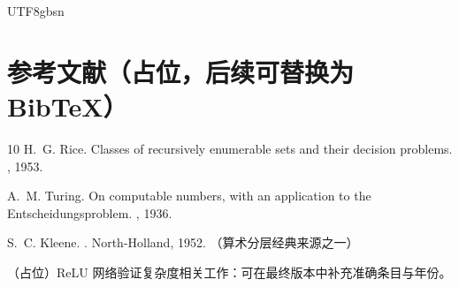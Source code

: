 \documentclass[letterpaper,twocolumn,10pt]{article}
\begin{document}
\begin{CJK}{UTF8}{gbsn}
\section*{参考文献（占位，后续可替换为 Bib\TeX）}
\begin{thebibliography}{10}\setlength{\itemsep}{0pt}
H.~G. Rice.
\newblock Classes of recursively enumerable sets and their decision problems.
, 1953.

A.~M. Turing.
\newblock On computable numbers, with an application to the {E}ntscheidungsproblem.
, 1936.

S.~C. Kleene.
.
\newblock North-Holland, 1952. （算术分层经典来源之一）

（占位）ReLU 网络验证复杂度相关工作：可在最终版本中补充准确条目与年份。
\end{thebibliography}

\end{CJK}
\end{document}
